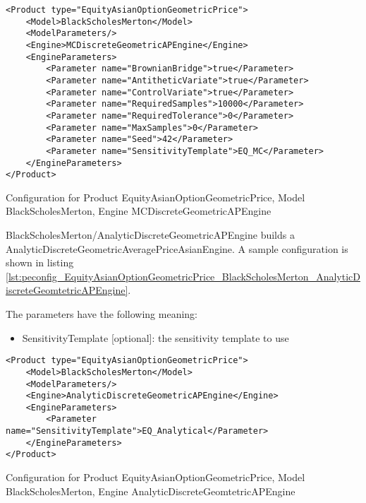 \begin{longlisting}
\begin{verbatim}
<Product type="EquityAsianOptionGeometricPrice">
    <Model>BlackScholesMerton</Model>
    <ModelParameters/>
    <Engine>MCDiscreteGeometricAPEngine</Engine>
    <EngineParameters>
        <Parameter name="BrownianBridge">true</Parameter>    
        <Parameter name="AntitheticVariate">true</Parameter>    
        <Parameter name="ControlVariate">true</Parameter>    
        <Parameter name="RequiredSamples">10000</Parameter>    
        <Parameter name="RequiredTolerance">0</Parameter>    
        <Parameter name="MaxSamples">0</Parameter>    
        <Parameter name="Seed">42</Parameter>    
        <Parameter name="SensitivityTemplate">EQ_MC</Parameter>
    </EngineParameters>
</Product>
\end{verbatim}
\caption{Configuration for Product EquityAsianOptionGeometricPrice, Model BlackScholesMerton, Engine MCDiscreteGeometricAPEngine}
\label{lst:peconfig_EquityAsianOptionGeometricPrice_BlackScholesMerton_MCDiscreteGeomtetricAPEngine}
\end{longlisting}

BlackScholesMerton/AnalyticDiscreteGeometricAPEngine builds a AnalyticDiscreteGeometricAveragePriceAsianEngine. A sample
configuration is shown in listing
\ref{lst:peconfig_EquityAsianOptionGeometricPrice_BlackScholesMerton_AnalyticDiscreteGeomtetricAPEngine}.

The parameters have the following meaning:

\begin{itemize}
\item SensitivityTemplate [optional]: the sensitivity template to use 
\end{itemize}

\begin{longlisting}
\begin{verbatim}
<Product type="EquityAsianOptionGeometricPrice">
    <Model>BlackScholesMerton</Model>
    <ModelParameters/>
    <Engine>AnalyticDiscreteGeometricAPEngine</Engine>
    <EngineParameters>
        <Parameter name="SensitivityTemplate">EQ_Analytical</Parameter>
    </EngineParameters>
</Product>
\end{verbatim}
\caption{Configuration for Product EquityAsianOptionGeometricPrice, Model BlackScholesMerton, Engine AnalyticDiscreteGeomtetricAPEngine}
\label{lst:peconfig_EquityAsianOptionGeometricPrice_BlackScholesMerton_AnalyticDiscreteGeomtetricAPEngine}
\end{longlisting}

